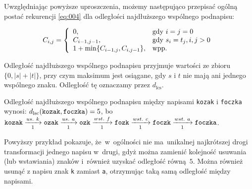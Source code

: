\documentclass{praca1}
\begin{document}
Uwzględniając powyższe uproszczenia, możemy następująco przepisać ogólną postać rekurencji \ref{eq:004} dla odległości najdłuższego wspólnego podnapisu:

\begin{equation*}
C_{i,j} = \left\{
\begin{array}{l l}     
    0, & \text{gdy } i = j = 0 \\
    C_{i-1, j-1}, & \text{gdy } s_i = t_j, i, j > 0  \\
    1 + \min\{C_{i-1, j}, C_{i, j-1}\}, & \text{wpp.} \\    
\end{array}\right.
\end{equation*}



Odległość najdłuższego wspólnego podnapisu przyjmuje wartości ze zbioru $\{0, |s|+|t|\}$, przy czym maksimum jest osiągane, gdy $s$ i $t$ nie mają ani jednego wspólnego znaku. Odległość tę oznaczamy przez $d_{\mathrm{lcs}}$.

\begin{example}
Odległość najdłuższego wspólnego podnapisu między napisami \verb|kozak| i \verb|foczka| wynosi: $d_{\mathrm{lsc}}(\verb|kozak|, \verb|foczka|) = 5$, bo~$\verb|kozak|\xrightarrow[1]{us.\ k} \verb|ozak| \xrightarrow[1]{us.\ a} \verb|ozk| \xrightarrow[1]{wst.\ f} \verb|fozk| \xrightarrow[1]{wst.\ c} \verb|foczk| \xrightarrow[1]{wst.\ a} \verb|foczka|$.
\end{example}

Powyższy przykład pokazuje, że~w~ogólności nie ma~unikalnej najkrótszej drogi transformacji jednego napisu w~drugi, gdyż można zamienić kolejność usuwania (lub wstawiania) znaków i~również uzyskać odległość równą~$5$. Można również usunąć z napisu znak \verb|k| zamiast \verb|a|, otrzymując taką samą odległość między napisami.
\end{document}
